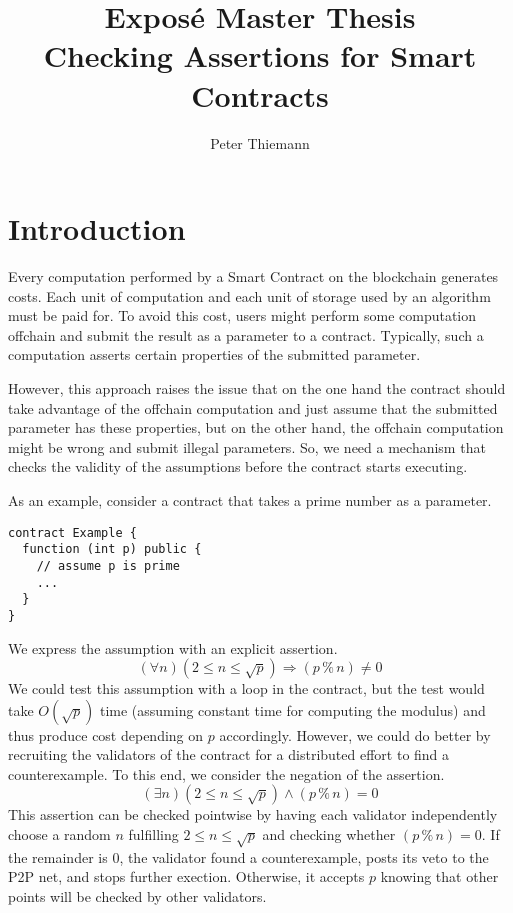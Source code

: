 \documentclass{article}
\title{Expos\'{e} Master Thesis\\
  Checking Assertions for Smart Contracts}
\author{Peter Thiemann}
\begin{document}
\maketitle{}

\section{Introduction}
\label{sec:introduction}

Every computation performed by a Smart Contract on the blockchain generates costs. Each
unit of computation and each unit of storage used by an algorithm must be paid for. To
avoid this cost, users might perform some computation offchain and submit the result as a
parameter to a contract. Typically, such a computation asserts certain properties of the
submitted parameter. 

However, this approach raises the issue that on the one hand the contract should take
advantage of the offchain computation and just assume that the submitted parameter has
these properties, but on the other hand, the offchain computation might be wrong and
submit illegal parameters. So, we need a mechanism that checks the validity of the
assumptions before the contract starts executing.

As an example, consider a contract that takes a prime number as a parameter.
\begin{lstlisting}[numbers=none]
contract Example {
  function (int p) public {
    // assume p is prime
    ...
  }
}
\end{lstlisting}
We express the assumption with an explicit assertion.
\begin{displaymath}
  (\forall n) (2 \le n \le \sqrt p) \Rightarrow (p \mathbin{\%} n) \ne 0
\end{displaymath}
We could test this assumption with a loop in the contract, but the test would take
$O(\sqrt p)$ time (assuming constant time for computing the modulus) and thus produce cost
depending on $p$ accordingly. 
However, we could do better by recruiting the validators of the contract for a distributed
effort to find a counterexample. To this end, we consider the negation of the assertion.
\begin{displaymath}
  (\exists n) (2 \le n \le \sqrt p) \wedge (p \mathbin{\%} n) = 0
\end{displaymath}
This assertion can be checked pointwise by having each validator independently choose a
random $n$ fulfilling $2 \le n \le 
\sqrt p$ and checking whether $(p \mathbin{\%} n) = 0$. If the remainder is $0$, the
validator found a counterexample, posts its veto to the P2P net, and stops further
exection. Otherwise, it accepts $p$ knowing that other points will be checked by other
validators.
\end{document}
